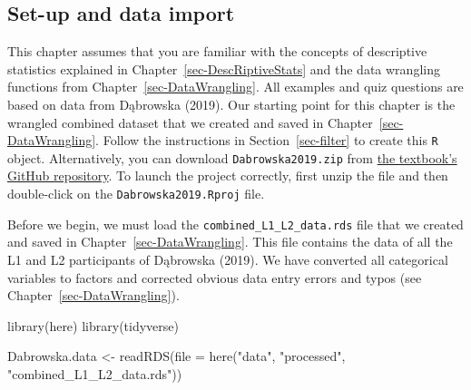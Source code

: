 \documentclass[
  letterpaper,
  DIV=11,
  numbers=noendperiod]{scrreprt}
\newenvironment{Shaded}{\begin{snugshade}}{\end{snugshade}}
\newcommand{\AttributeTok}[1]{\textcolor[rgb]{0.40,0.45,0.13}{#1}}
\newcommand{\FunctionTok}[1]{\textcolor[rgb]{0.28,0.35,0.67}{#1}}
\newcommand{\NormalTok}[1]{\textcolor[rgb]{0.00,0.23,0.31}{#1}}
\newcommand{\OtherTok}[1]{\textcolor[rgb]{0.00,0.23,0.31}{#1}}
\newcommand{\StringTok}[1]{\textcolor[rgb]{0.13,0.47,0.30}{#1}}
\begin{document}
\subsection*{Set-up and data import}\label{set-up-and-data-import}

\begin{tcolorbox}[enhanced jigsaw, arc=.35mm, bottomrule=.15mm, bottomtitle=1mm, breakable, colback=white, colbacktitle=quarto-callout-warning-color!10!white, colframe=quarto-callout-warning-color-frame, coltitle=black, left=2mm, leftrule=.75mm, opacityback=0, opacitybacktitle=0.6, rightrule=.15mm, title=\textcolor{quarto-callout-warning-color}{\faExclamationTriangle}\hspace{0.5em}{Prerequisites}, titlerule=0mm, toprule=.15mm, toptitle=1mm]

This chapter assumes that you are familiar with the concepts of
descriptive statistics explained in Chapter~\ref{sec-DescRiptiveStats}
and the data wrangling functions from Chapter~\ref{sec-DataWrangling}.
All examples and quiz questions are based on data from Dąbrowska (2019).
Our starting point for this chapter is the wrangled combined dataset
that we created and saved in Chapter~\ref{sec-DataWrangling}. Follow the
instructions in Section~\ref{sec-filter} to create this \texttt{R}
object. Alternatively, you can download \texttt{Dabrowska2019.zip} from
\href{https://github.com/elenlefoll/RstatsTextbook/raw/69d1e31be7394f2b612825f031ebffeb75886390/Dabrowska2019.zip}{the
textbook's GitHub repository}. To launch the project correctly, first
unzip the file and then double-click on the \texttt{Dabrowska2019.Rproj}
file.

\end{tcolorbox}

Before we begin, we must load the \texttt{combined\_L1\_L2\_data.rds}
file that we created and saved in Chapter~\ref{sec-DataWrangling}. This
file contains the data of all the L1 and L2 participants of Dąbrowska
(2019). We have converted all categorical variables to factors and
corrected obvious data entry errors and typos (see
Chapter~\ref{sec-DataWrangling}).

\begin{Shaded}
\begin{Highlighting}[]
\FunctionTok{library}\NormalTok{(here)}
\FunctionTok{library}\NormalTok{(tidyverse)}

\NormalTok{Dabrowska.data }\OtherTok{\textless{}{-}} \FunctionTok{readRDS}\NormalTok{(}\AttributeTok{file =} \FunctionTok{here}\NormalTok{(}\StringTok{"data"}\NormalTok{, }\StringTok{"processed"}\NormalTok{, }\StringTok{"combined\_L1\_L2\_data.rds"}\NormalTok{))}
\end{Highlighting}
\end{Shaded}
\end{document}
